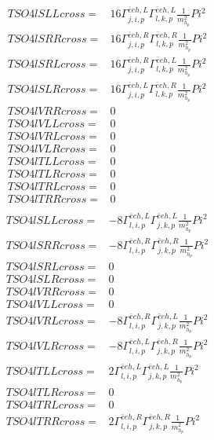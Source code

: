 \documentclass[A4,landscape]{article}
\begin{document}
\begin{align} 
  TSO4lSLLcross= & 16 \Gamma^{\bar{e}e h ,L}_{j, i, p} \Gamma^{\bar{e}e h ,L}_{l, k, p} \frac{1}{m^2_{h_{{p}}}} Pi^2 \\ 
  TSO4lSRRcross= & 16 \Gamma^{\bar{e}e h ,R}_{j, i, p} \Gamma^{\bar{e}e h ,R}_{l, k, p} \frac{1}{m^2_{h_{{p}}}} Pi^2 \\ 
  TSO4lSRLcross= & 16 \Gamma^{\bar{e}e h ,R}_{j, i, p} \Gamma^{\bar{e}e h ,L}_{l, k, p} \frac{1}{m^2_{h_{{p}}}} Pi^2 \\ 
  TSO4lSLRcross= & 16 \Gamma^{\bar{e}e h ,L}_{j, i, p} \Gamma^{\bar{e}e h ,R}_{l, k, p} \frac{1}{m^2_{h_{{p}}}} Pi^2 \\ 
  TSO4lVRRcross= & 0 \\ 
  TSO4lVLLcross= & 0 \\ 
  TSO4lVRLcross= & 0 \\ 
  TSO4lVLRcross= & 0 \\ 
  TSO4lTLLcross= & 0 \\ 
  TSO4lTLRcross= & 0 \\ 
  TSO4lTRLcross= & 0 \\ 
  TSO4lTRRcross= & 0 \\ 
\end{align} 
\begin{align} 
  TSO4lSLLcross= & -8 \Gamma^{\bar{e}e h ,L}_{l, i, p} \Gamma^{\bar{e}e h ,L}_{j, k, p} \frac{1}{m^2_{h_{{p}}}} Pi^2 \\ 
  TSO4lSRRcross= & -8 \Gamma^{\bar{e}e h ,R}_{l, i, p} \Gamma^{\bar{e}e h ,R}_{j, k, p} \frac{1}{m^2_{h_{{p}}}} Pi^2 \\ 
  TSO4lSRLcross= & 0 \\ 
  TSO4lSLRcross= & 0 \\ 
  TSO4lVRRcross= & 0 \\ 
  TSO4lVLLcross= & 0 \\ 
  TSO4lVRLcross= & -8 \Gamma^{\bar{e}e h ,R}_{l, i, p} \Gamma^{\bar{e}e h ,L}_{j, k, p} \frac{1}{m^2_{h_{{p}}}} Pi^2 \\ 
  TSO4lVLRcross= & -8 \Gamma^{\bar{e}e h ,L}_{l, i, p} \Gamma^{\bar{e}e h ,R}_{j, k, p} \frac{1}{m^2_{h_{{p}}}} Pi^2 \\ 
  TSO4lTLLcross= & 2 \Gamma^{\bar{e}e h ,L}_{l, i, p} \Gamma^{\bar{e}e h ,L}_{j, k, p} \frac{1}{m^2_{h_{{p}}}} Pi^2 \\ 
  TSO4lTLRcross= & 0 \\ 
  TSO4lTRLcross= & 0 \\ 
  TSO4lTRRcross= & 2 \Gamma^{\bar{e}e h ,R}_{l, i, p} \Gamma^{\bar{e}e h ,R}_{j, k, p} \frac{1}{m^2_{h_{{p}}}} Pi^2 \\ 
\end{align} 
\end{document}
